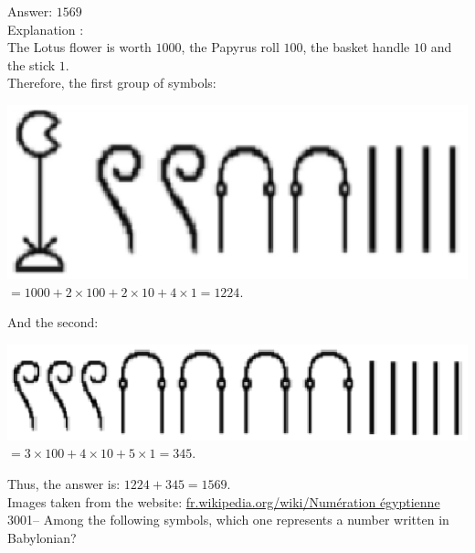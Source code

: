 \documentclass[letterpaper, 12pt]{article}
\begin{document}
Answer: $1569$\\

Explanation :\\
The Lotus flower is worth $1000$, the Papyrus roll $100$, the basket handle $10$ and the stick $1$.\\
Therefore, the first group of symbols:\\
\begin{center}
\includegraphics[scale=0.35]{1224.eps}\\
$= 1000 + 2 \times 100 + 2 \times 10 + 4 \times 1 = 1224$.\\[4mm]
\end{center}
And the second:\\
\begin{center}
\includegraphics[scale=0.35]{345.eps}\\
$= 3 \times 100 + 4 \times 10 + 5 \times 1  = 345$.\\[4mm]
\end{center}
Thus, the answer is: $1224 + 345 = 1569$.\\

Images taken from the website: \href{http://fr.wikipedia.org/wiki/Num\%C3\%A9ration \%C3\%A9gyptienne}{fr.wikipedia.org/wiki/Num\'eration \'egyptienne}\\



3001-- Among the following symbols, which one represents a number written in Babylonian?\\
\end{document}
